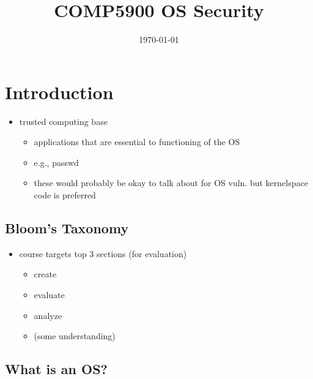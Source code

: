 \documentclass[
  12pt]{findlay}
\title{COMP5900 OS Security}
\date{\today}
\providecommand{\tightlist}{%
  \setlength{\itemsep}{0pt}\setlength{\parskip}{0pt}}
\begin{document}
\maketitle

\hypertarget{introduction}{%
\section{Introduction}\label{introduction}}

\begin{itemize}
\tightlist
\item
  trusted computing base

  \begin{itemize}
  \tightlist
  \item
    applications that are essential to functioning of the OS
  \item
    e.g., passwd
  \item
    these would probably be okay to talk about for OS vuln. but
    kernelspace code is preferred
  \end{itemize}
\end{itemize}

\hypertarget{blooms-taxonomy}{%
\subsection{Bloom's Taxonomy}\label{blooms-taxonomy}}

\begin{itemize}
\tightlist
\item
  course targets top 3 sections (for evaluation)

  \begin{itemize}
  \tightlist
  \item
    create
  \item
    evaluate
  \item
    analyze
  \item
    (some understanding)
  \end{itemize}
\end{itemize}

\hypertarget{what-is-an-os}{%
\subsection{What is an OS?}\label{what-is-an-os}}
\end{document}
